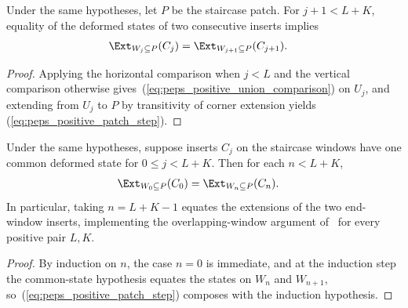 \begin{lemma}%
    \label{thm:peps_positive_staircase_patch_step}
    \leanok
    Under the same hypotheses, let $P$ be the staircase patch.
    For $j+1<L+K$, equality of the deformed states of two consecutive
    inserts implies
    \begin{align}
        \Ext_{W_j\subseteq P}(C_j)
         & =\Ext_{W_{j+1}\subseteq P}(C_{j+1}).
        \label{eq:peps_positive_patch_step}
    \end{align}
\end{lemma}
\begin{proof}\leanok
    Applying the horizontal comparison when $j<L$ and the vertical comparison
    otherwise gives~(\ref{eq:peps_positive_union_comparison}) on $U_j$, and extending from
    $U_j$ to $P$ by transitivity of corner extension yields
    (\ref{eq:peps_positive_patch_step}).
\end{proof}

\begin{lemma}%
    \label{thm:peps_positive_staircase_patch_chain}
    \leanok
    Under the same hypotheses, suppose inserts $C_j$ on the staircase
    windows have one common deformed state for $0\leq j<L+K$.
    Then for each $n<L+K$,
    \begin{align}
        \Ext_{W_0\subseteq P}(C_0)
         & =\Ext_{W_n\subseteq P}(C_n).
        \label{eq:peps_positive_patch_chain}
    \end{align}
    In particular, taking $n=L+K-1$ equates the extensions of the two end-window inserts,
    implementing the overlapping-window argument
    of~\cite{Molnar2018NormalPEPS} for every positive pair $L,K$.
\end{lemma}
\begin{proof}\leanok
    By induction on $n$, the case $n=0$ is immediate, and at the induction step
    the common-state hypothesis equates the states on
    $W_n$ and $W_{n+1}$, so~(\ref{eq:peps_positive_patch_step})
    composes with the induction hypothesis.
\end{proof}
